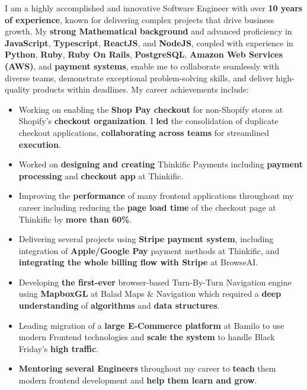 I am a highly accomplished and innovative Software Engineer with over \textbf{10 years of experience}, known for delivering complex projects that drive business growth. My \textbf{strong Mathematical background} and advanced proficiency in \textbf{JavaScript}, \textbf{Typescript}, \textbf{ReactJS}, and \textbf{NodeJS}, coupled with experience in \textbf{Python}, \textbf{Ruby}, \textbf{Ruby On Rails}, \textbf{PostgreSQL}, \textbf{Amazon Web Services (AWS)}, and \textbf{payment systems}, enable me to collaborate seamlessly with diverse teams, demonstrate exceptional problem-solving skills, and deliver high-quality products within deadlines. My career achievements include:
\medskip
\begin{itemize}
    \item Working on enabling the \textbf{Shop Pay checkout} for non-Shopify stores at Shopify's \textbf{checkout organization}. I \textbf{led} the consolidation of duplicate checkout applications, \textbf{collaborating across teams} for streamlined \textbf{execution}.
    \item Worked on \textbf{designing and creating} Thinkific Payments including \textbf{payment processing} and \textbf{checkout app} at Thinkific.
    \item Improving the \textbf{performance} of many frontend applications throughout my career including reducing the \textbf{page load time} of the checkout page at Thinkific by \textbf{more than 60\%}.
    \item Delivering several projects using \textbf{Stripe payment system}, including integration of \textbf{Apple/Google Pay} payment methods at Thinkific, and \textbf{integrating the whole billing flow with Stripe} at BrowseAI.
    \item Developing \textbf{the first-ever} browser-based Turn-By-Turn Navigation engine using \textbf{MapboxGL} at Balad Maps \& Navigation which required a \textbf{deep understanding} of \textbf{algorithms} and \textbf{data structures}.
    \item Leading migration of a \textbf{large E-Commerce platform} at Bamilo to use modern Frontend technologies and \textbf{scale the system} to handle Black Friday's \textbf{high traffic}.
    \item \textbf{Mentoring several Engineers} throughout my career to \textbf{teach} them modern frontend development and \textbf{help them learn and grow}.
\end{itemize}

